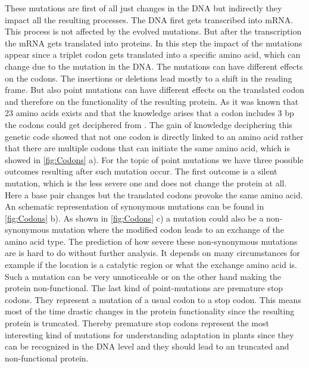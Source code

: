 These mutations are first of all just changes in the DNA but indirectly they impact all the resulting processes. The DNA first gets transcribed into mRNA. This process is not affected by the evolved mutations. But after the transcription the mRNA gets translated into proteins. In this step the impact of the mutations appear since a triplet codon gets translated into a specific amino acid, which can change due to the mutation in the DNA. The mutations can have different effects on the codons. The insertions or deletions lead mostly to a shift in the reading frame. But also point mutations can have different effects on the translated codon and therefore on the functionality of the resulting protein. As it was known that 23 amino acids exists and that the knowledge arises that a codon includes 3 bp the codons could get deciphered from \textcite{Nirenberg1965}. The gain of knowledge deciphering this genetic code showed that not one codon is directly linked to an amino acid rather that there are multiple codons that can initiate the same amino acid, which is showed in \autoref{fig:Codons} a). For the topic of point mutations we have three possible outcomes resulting after such mutation occur. The first outcome is a silent mutation, which is the less severe one and does not change the protein at all. Here a base pair changes but the translated codons provoke the same amino acid. An schematic representation of synonymous mutations can be found in \autoref{fig:Codons} b). As shown in \autoref{fig:Codons} c) a mutation could also be a non-synonymous mutation where the modified codon leads to an exchange of the amino acid type. The prediction of how severe these non-synonymous mutations are is hard to do without further analysis. It depends on many circumstances for example if the location is a catalytic region or what the exchange amino acid is. Such a mutation can be very unnoticeable or on the other hand making the protein non-functional. The last kind of point-mutations are premature stop codons. They represent a mutation of a usual codon to a stop codon. This means most of the time drastic changes in the protein functionality since the resulting protein is truncated. Thereby premature stop codons represent the most interesting kind of mutations for understanding adaptation in plants since they can be recognized in the DNA level and they should lead to an truncated and non-functional protein. 
